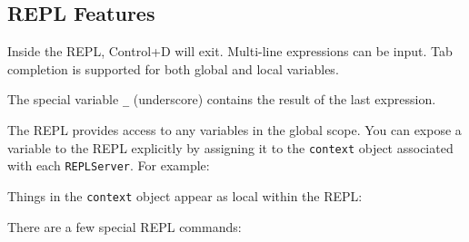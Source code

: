 \subsection{REPL Features}

Inside the REPL, Control+D will exit. Multi-line expressions can be
input. Tab completion is supported for both global and local variables.

The special variable \texttt{\_} (underscore) contains the result of the
last expression.

\begin{Shaded}
\begin{Highlighting}[]
\NormalTok{> [ }\NormalTok{, }\NormalTok{, } \NormalTok{]}
\NormalTok{[ }\NormalTok{, }\NormalTok{, } \NormalTok{]}
\NormalTok{> }\KeywordTok{_}
\NormalTok{> _ += }
\end{Highlighting}
\end{Shaded}

The REPL provides access to any variables in the global scope. You can
expose a variable to the REPL explicitly by assigning it to the
\texttt{context} object associated with each \texttt{REPLServer}. For
example:

\begin{Shaded}
\begin{Highlighting}[]
 \NormalTok{),}
    \NormalTok{;}

\NormalTok{(} 
\end{Highlighting}
\end{Shaded}

Things in the \texttt{context} object appear as local within the REPL:

\begin{Shaded}
\begin{Highlighting}[]
\end{Highlighting}
\end{Shaded}

There are a few special REPL commands:

